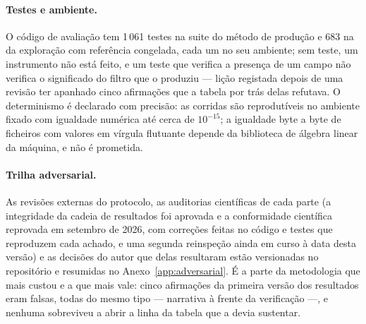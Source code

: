 \paragraph{Testes e ambiente.} O código de avaliação tem 1\,061 testes na
suite do método de produção e 683 na da exploração com referência
congelada, cada um no seu ambiente; sem teste, um instrumento não está
feito, e um teste que verifica a presença de um campo não verifica o
significado do filtro que o produziu --- lição registada depois de uma
revisão ter apanhado cinco afirmações que a tabela por trás delas refutava.
O determinismo é declarado com precisão: as corridas são reprodutíveis no
ambiente fixado com igualdade numérica até cerca de $10^{-15}$; a igualdade
byte a byte de ficheiros com valores em vírgula flutuante depende da
biblioteca de álgebra linear da máquina, e não é prometida.

\paragraph{Trilha adversarial.} As revisões externas do protocolo, as
auditorias científicas de cada parte (a integridade da cadeia de
resultados foi aprovada e a conformidade científica reprovada em setembro
de 2026, com correções feitas no código e testes que reproduzem cada
achado, e uma segunda reinspeção ainda em curso à data desta versão) e as
decisões do autor que delas resultaram estão versionadas no repositório e
resumidas no Anexo~\ref{app:adversarial}. É a parte da metodologia que
mais custou e a que mais vale: cinco afirmações da primeira versão dos
resultados eram falsas, todas do mesmo tipo --- narrativa à frente da
verificação ---, e nenhuma sobreviveu a abrir a linha da tabela que a
devia sustentar.
